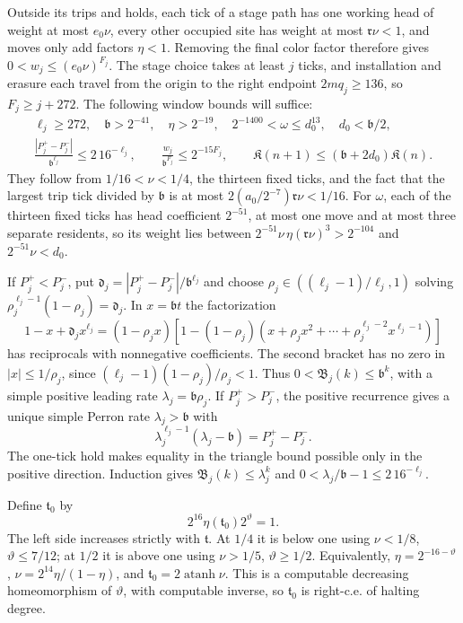 Outside its trips and holds, each tick of a stage path has one working head of weight at most \(e_0\nu\), every other occupied site has weight at most \(\mathfrak r\nu<1\), and moves only add factors \(\eta<1\). Removing the final color factor therefore gives \(0<w_j\le(e_0\nu)^{F_j}\). The stage choice takes at least \(j\) ticks, and installation and erasure each travel from the origin to the right endpoint \(2mq_j\ge136\), so \(F_j\ge j+272\). The following window bounds will suffice:
\begin{equation}\label{eq:binary-estimates}
\begin{gathered}
 \ell_j\ge272,\quad \mathfrak b>2^{-41},\quad
 \eta>2^{-19},\quad 2^{-1400}<\omega\le d_0^{13},\quad d_0<\mathfrak b/2,\\
 \frac{|P_j^+-P_j^-|}{\mathfrak b^{\ell_j}}
       \le2\,16^{-\ell_j},\qquad
 \frac{w_j}{\mathfrak b^{F_j}}\le2^{-15F_j},\qquad
 \mathfrak K(n+1)\le(\mathfrak b+2d_0)\mathfrak K(n).
\end{gathered}
\end{equation}
They follow from \(1/16<\nu<1/4\), the thirteen fixed ticks, and the fact that the largest trip tick divided by \(\mathfrak b\) is at most \(2(a_0/2^{-7})\mathfrak r\nu<1/16\). For \(\omega\), each of the thirteen fixed ticks has head coefficient \(2^{-51}\), at most one move and at most three separate residents, so its weight lies between \(2^{-51}\nu\,\eta(\mathfrak r\nu)^3>2^{-104}\) and \(2^{-51}\nu<d_0\).

If \(P_j^+<P_j^-\), put \(\mathfrak d_j=|P_j^+-P_j^-|/\mathfrak b^{\ell_j}\) and choose \(\rho_j\in((\ell_j-1)/\ell_j,1)\) solving \(\rho_j^{\ell_j-1}(1-\rho_j)=\mathfrak d_j\). In \(x=\mathfrak bt\) the factorization
\[
 1-x+\mathfrak d_jx^{\ell_j}=(1-\rho_jx)
 \left[1-(1-\rho_j)(x+\rho_jx^2+\cdots+
           \rho_j^{\ell_j-2}x^{\ell_j-1})\right]
\]
has reciprocals with nonnegative coefficients. The second bracket has no zero in \(|x|\le1/\rho_j\), since \((\ell_j-1)(1-\rho_j)/\rho_j<1\). Thus \(0<\mathfrak B_j(k)\le\mathfrak b^k\), with a simple positive leading rate \(\lambda_j=\mathfrak b\rho_j\). If \(P_j^+>P_j^-\), the positive recurrence gives a unique simple Perron rate \(\lambda_j>\mathfrak b\) with
\[
 \lambda_j^{\ell_j-1}(\lambda_j-\mathfrak b)=P_j^+-P_j^-.
\]
The one-tick hold makes equality in the triangle bound possible only in the positive direction. Induction gives \(\mathfrak B_j(k)\le\lambda_j^k\) and
\(0<\lambda_j/\mathfrak b-1\le2\,16^{-\ell_j}\).

Define \(\mathfrak t_0\) by
\begin{equation}\label{eq:binary-cut}
 2^{16}\eta(\mathfrak t_0)2^\vartheta=1.
\end{equation}
The left side increases strictly with \(\mathfrak t\). At \(1/4\) it is below one using \(\nu<1/8\), \(\vartheta\le7/12\); at \(1/2\) it is above one using \(\nu>1/5\), \(\vartheta\ge1/2\). Equivalently, \(\eta=2^{-16-\vartheta}\), \(\nu=2^{14}\eta/(1-\eta)\), and \(\mathfrak t_0=2\operatorname{atanh}\nu\). This is a computable decreasing homeomorphism of \(\vartheta\), with computable inverse, so \(\mathfrak t_0\) is right-c.e. of halting degree.

